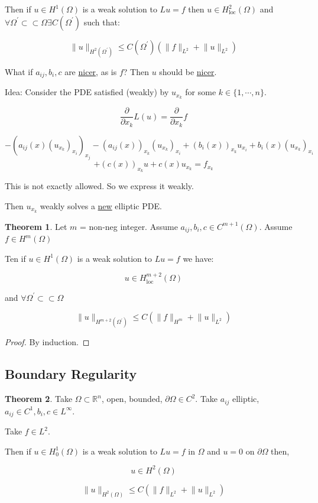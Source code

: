 \documentclass{article}
\theoremstyle{definition}
\newtheorem{theorem}{Theorem}
\begin{document}
Then if \(u\in H^1(\Omega)\) is a weak solution to \(L u = f\) then \(u\in H^2_{\operatorname{loc}} (\Omega)\) and \(\forall \Omega ^{\prime} \subset \subset \Omega \exists C(\Omega ^{\prime} )\) such that:

\[
    \lVert u \rVert _{H^2(\Omega^{\prime})} \leq C(\Omega ^{\prime} ) ( \lVert f \rVert _{L^2} + \lVert u \rVert _{L^2})
\]

What if \(a_{ij}, b_i, c\) are \underline{nicer}, as is \(f\)? Then \(u\) should be \underline{nicer}.

Idea: Consider the PDE satisfied (weakly) by \(u_{x_k}\) for some \(k\in \{ 1, \cdots , n \}\).

\[
    \frac{\partial}{\partial x_k} L(u) = \frac{\partial}{\partial x_k} f
\]

\[
    - (a_{ij}(x) (u_{x_k})_{x_i})_{x_j} - (a_{ij} (x))_{x_k} (u_{x_k})_{x_i} + (b_i(x))_{x_k} u_{x_i} + b_i(x)(u_{x_k})_{x_i} 
\]
\[
    + (c(x))_{x_k} u + c(x) u_{x_k} = f_{x_k} 
\]

This is not exactly allowed. So we express it weakly.

Then \(u_{x_k} \) weakly solves a \underline{new} elliptic PDE.

\begin{theorem}
    Let \(m\) = non-neg integer. Assume \(a_{ij} , b_i, c \in C^{m+1} (\Omega)\). Assume \(f\in H^m(\Omega)\) 
    
    Ten if \(u\in H^1(\Omega)\) is a weak solution to \(Lu = f\) we have:

    \[
        u \in H^{m+2}_{\operatorname{loc}} (\Omega)
    \]

    and \(\forall \Omega ^{\prime} \subset \subset \Omega\) 
    
    \[
        \lVert u \rVert _{H^{m+2}(\Omega^{\prime})} \leq C (\lVert f \rVert _{H^m} + \lVert u \rVert _{L^2})
    \]
\end{theorem}

\begin{proof}
    By induction.
\end{proof}

\subsection*{Boundary Regularity}

\begin{theorem}
    Take \(\Omega \subset \mathbb{R}^n\), open, bounded, \(\partial \Omega \in C^2\). Take \(a_{ij}\) elliptic, \(a_{ij} \in C^1, b_i, c \in L^{\infty}\).

    Take \(f\in L^2\).

    Then if \(u\in H^1_0(\Omega)\) is a weak solution to \(Lu = f\) in \(\Omega\) and \(u=0\) on \(\partial \Omega\) then,

    \[
        u\in H^2(\Omega)
    \]

    \[
        \lVert u \rVert _{H^2(\Omega)} \leq C (\lVert f \rVert _{L^2} + \lVert u \rVert _{L^2})
    \]
\end{theorem}
\end{document}
